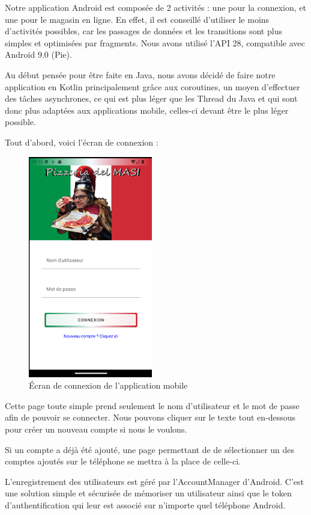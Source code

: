 Notre application Android est composée de 2 activités : une pour la connexion, et une pour le magasin en
ligne. En effet, il est conseillé d'utiliser le moins d'activités possibles, car les passages de données et les
transitions sont plus simples et optimisées par fragments.
Nous avons utilisé l'API 28, compatible avec Android 9.0 (Pie).

Au début pensée pour être faite en Java, nous avons décidé de faire notre application en Kotlin
principalement grâce aux coroutines, un moyen d'effectuer des tâches asynchrones, ce qui est plus léger
que les Thread du Java et qui sont donc plus adaptées aux applications mobile, celles-ci devant être le
plus léger possible.

Tout d'abord, voici l'écran de connexion :

\begin{figure}[H]
    \centering
    \includegraphics[scale=.9]{./img/joey-img-4.png}
    \caption{Écran de connexion de l'application mobile}
    \label{fig:poc-login-screen}
\end{figure}

Cette page toute simple prend seulement le nom d'utilisateur et le
mot de passe afin de pouvoir se connecter. Nous pouvons cliquer sur
le texte tout en-dessous pour créer un nouveau compte si nous le voulons.

Si un compte a déjà été ajouté, une page permettant de de
sélectionner un des comptes ajoutés sur le téléphone se mettra à la place de celle-ci.

L'enregistrement des utilisateurs est géré par l'AccountManager d'Android. C'est une solution simple et
sécurisée de mémoriser un utilisateur ainsi que le token d'authentification qui leur est associé sur
n'importe quel téléphone Android.

